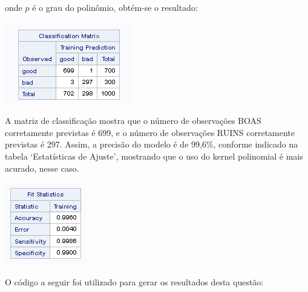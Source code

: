 \documentclass[
  a4paperpaper,
]{article}
\begin{document}
onde \(p\) é o grau do polinômio, obtém-se o resultado:

\begin{center}
\includegraphics{tabela_classification.png}
\end{center}

A matriz de classificação mostra que o número de observações BOAS
corretamente previstas é 699, e o número de observações RUINS
corretamente previstas é 297. Assim, a precisão do modelo é de 99,6\%,
conforme indicado na tabela `Estatísticas de Ajuste', mostrando que o
uso do kernel polinomial é mais acurado, nesse caso.

\begin{center}
\includegraphics{tabela_fit.png}
\end{center}

O código a seguir foi utilizado para gerar os resultados desta questão:
\end{document}
